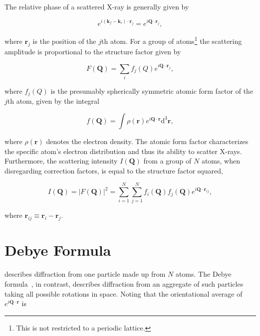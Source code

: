 \documentclass[11pt,twoside]{report}
\begin{document}
\indent The relative phase of a scattered X-ray is generally given by


\begin{equation}
e^{i({\mathbf k}_{f} - {\mathbf k}_{i})\cdot{\mathbf r}_{j}} = e^{i{\mathbf Q}\cdot{\mathbf r}_{j}} ,
\label{eq:phase}
\end{equation} 


\noindent where ${\mathbf r}_{j}$ is the position of the $j$th atom. For a group of atoms\footnote{This is not restricted to a periodic lattice.} the scattering amplitude is proportional to the structure factor given by

\begin{equation}
F({\mathbf Q}) = \sum_{i} f_{j}(Q)e^{i{\mathbf Q}\cdot{\mathbf r}_{j}} ,
\label{eq:F}
\end{equation} 

\noindent where $f_{j}(Q)$ is the presumably spherically symmetric atomic form factor of the $j$th atom, given by the integral

\begin{equation}
f({\mathbf Q}) = \int \rho({\mathbf r})e^{i{\mathbf Q}\cdot{\mathbf r}}\mathrm{d}^{3}{\mathbf r} ,
\label{eq:atomic_form_factor}
\end{equation} 

\noindent where $\rho({\mathbf r})$ denotes the electron density. The atomic form factor characterizes the specific atom's electron distribution and thus its ability to scatter X-rays. Furthermore, the scattering intensity $I({\mathbf Q})$ from a group of $N$ atoms, when disregarding correction factors, is equal to the structure factor squared,

\begin{equation}
I({\mathbf Q}) = |F({\mathbf Q})|^{2} = \sum_{i=1}^{N}\sum_{j=1}^{N} f_{i}({\mathbf Q})f_{j}({\mathbf Q})e^{i{\mathbf Q}\cdot{\mathbf r}_{ij}} ,
\label{eq:FF}
\end{equation} 

\noindent where ${\mathbf r}_{ij} \equiv {\mathbf r}_{i}-{\mathbf r}_{j}$.

\section{Debye Formula}
\label{sec:debye}
 describes diffraction from one particle made up from $N$ atoms. The Debye formula~\cite{xrayphys}, in contrast, describes diffraction from an aggregate of such particles taking all possible rotations in space. Noting that the orientational average of $e^{i{\mathbf Q}\cdot{\mathbf r}}$ is
\end{document}
